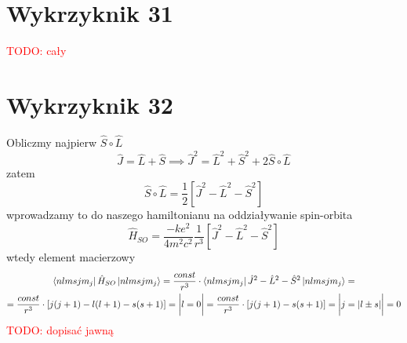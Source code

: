\documentclass[a4paper,12pt]{article}
\newcommand\myworries[1]{\textcolor{red}{#1}} %
\begin{document}
\section{Wykrzyknik 31}
\myworries{TODO: cały}

\section{Wykrzyknik 32}
 	Obliczmy najpierw $\hat{S}\circ\hat{L}$ 
 		$$
 		\hat{J}= \hat{L}+\hat{S} \implies \hat{J}^2 = \hat{L}^2+\hat{S}^2 + 2\hat{S}\circ\hat{L}
 		$$
 	zatem
 		$$
 		\hat{S}\circ\hat{L}=\frac{1}{2}\left[\hat{J}^2-\hat{L}^2-\hat{S}^2 \right]
 		$$
 	wprowadzamy to do naszego hamiltonianu na oddziaływanie spin-orbita 
 		$$
 		\hat{H}_{SO} = \frac{-ke^2}{4m^2c^2}\frac{1}{r^3}\left[\hat{J}^2-\hat{L}^2-\hat{S}^2 \right]
 		$$
 	wtedy element macierzowy
 		$$
 		\begin{gathered}
 			\bra{nlmsjm_j}\hat{H}_{SO}\ket{nlmsjm_j} = \frac{const}{r^3}\cdot\bra{nlmsjm_j}\hat{J}^2-\hat{L}^2-\hat{S}^2\ket{nlmsjm_j} = \\ =\frac{const}{r^3}\cdot\left[j(j+1) - l(l+1)-s(s+1)\right] = \bigg\vert l = 0\bigg\vert = \frac{const}{r^3}\cdot\left[j(j+1) -s(s+1)\right] = \bigg\vert j = |l\pm s| \bigg\vert = 0
 		\end{gathered}
 		$$
\myworries{TODO: dopisać jawną}
\end{document}
